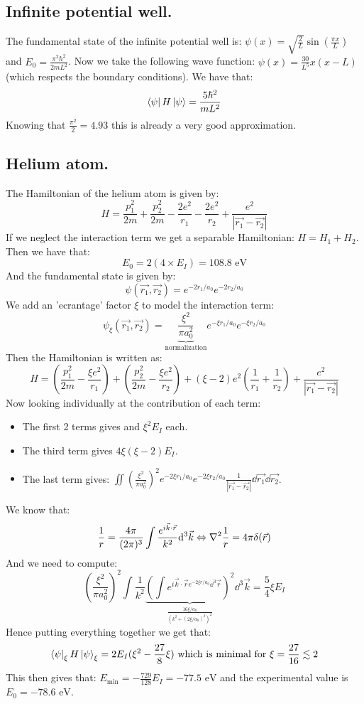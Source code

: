 \documentclass[10pt,a4paper]{book}
\begin{document}
\subsection{Infinite potential well.}
The fundamental state of the infinite potential well is: $\psi(x) = \sqrt{\frac{2}{L}} \sin(\frac{\pi x}{L})$ and $E_0 = \frac{\pi^2 \hbar^2}{2 m L^2}$. Now we take the following wave function: $\psi(x) = \frac{30}{L^5} x (x - L)$ (which respects the boundary conditions). We have that:
\[
\bra\psi H \ket \psi = \frac{5\hbar^2}{m L^2}
\]
Knowing that $\frac{\pi^2}{2} = 4.93$ this is already a very good approximation.

\subsection{Helium atom.}
The Hamiltonian of the helium atom is given by:
\[
H = \frac{p_1^2}{2m} + \frac{p_2^2}{2m} - \frac{2 e^2}{r_1} - \frac{2 e^2}{r_2} + \frac{e^2}{|\vec{r_1} - \vec{r_2}|}
\]
If we neglect the interaction term we get a separable Hamiltonian: $H = H_1 + H_2$. Then we have that:
\[
E_0 = 2 (4 \times E_I) = 108.8 \text{ eV}
\]
And the fundamental state is given by:
\[
\psi(\vec{r_1}, \vec{r_2}) = e^{-2r_1/a_0} e^{-2 r_2/a_0}
\]
We add an 'ecrantage' factor $\xi$ to model the interaction term:
\[
\psi_\xi (\vec{r_1}, \vec{r_2}) = \underbrace{\frac{\xi^2}{\pi a_0^2}}_{\text{normalization}} e^{-\xi r_1 /a_0} e^{-\xi r_2 / a_0}
\]
Then the Hamiltonian is written as:
\[
H = \left(\frac{p_1^2}{2m} - \frac{\xi e^2}{r_1}\right) + \left( \frac{p_2^2}{2m} - \frac{\xi e^2}{r_2}\right) + (\xi - 2) e^2 \left(\frac{1}{r_1} + \frac{1}{r_2}\right) + \frac{e^2}{|\vec{r_1} - \vec{r_2}|}
\]
Now looking individually at the contribution of each term:
\begin{itemize}
\item The first 2 terms gives and $\xi^2 E_I$ each.
\item The third term gives $4 \xi(\xi -2) E_I$.
\item The last term gives: $\iint \left(\frac{\xi^2}{\pi a_0^2}\right)^2 e^{-2 \xi r_1 /a_0}e^{-2\xi r_2/a_0} \frac{1}{|\vec{r_1} - \vec{r_2}|} \dd \vec{r_1} \dd \vec{r_2}$.
\end{itemize}
We know that:
\[
\frac{1}{r} = \frac{4\pi}{(2\pi)^3} \int \frac{e^{i \vec{k} \cdot \vec{r}}}{k^2} \dd^3 \vec{k} \Leftrightarrow \laplacian \frac{1}{r} = 4 \pi \delta(\vec{r})
\]
And we need to compute:
\[
\left(\frac{\xi^2}{\pi a_0^2}\right)^2 \int \frac{1}{k^2} \underbrace{\left(\int e^{i \vec{k} \cdot \vec{r} e^{-2 \xi r /a_0} \dd^3 \vec{r}}\right)^2}_{\frac{16 \xi /a_0}{(k^2 + (2\xi/a_0)^2)^2}} \dd^3\vec{k} = \frac{5}{4} \xi E_I
\]
Hence putting everything together we get that:
\[
\bra \psi_\xi H \ket \psi_\xi = 2 E_I (\xi^2 - \frac{27}{8} \xi) \text{ which is minimal for } \xi = \frac{27}{16} \lesssim 2
\]
This then gives that: $E_\text{min} = -\frac{729}{128}E_I = -77.5 \text{ eV}$ and the experimental value is $E_0 = - 78.6 \text{ eV}$.
\end{document}
